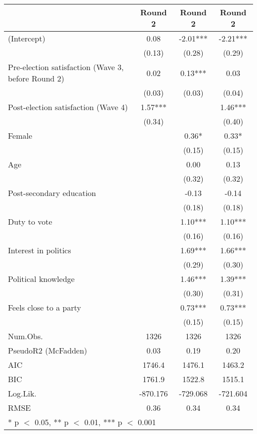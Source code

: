 \begin{table}
\centering
\begin{tabular}[t]{lccc}
\toprule
  & Round 2 & Round 2  & Round 2  \\
\midrule
(Intercept) & 0.08 & -2.01*** & -2.21***\\
 & (0.13) & (0.28) & (0.29)\\
Pre-election satisfaction (Wave 3, before Round 2) & 0.02 & 0.13*** & 0.03\\
 & (0.03) & (0.03) & (0.04)\\
Post-election satisfaction (Wave 4) & 1.57*** &  & 1.46***\\
 & (0.34) &  & (0.40)\\
Female &  & 0.36* & 0.33*\\
 &  & (0.15) & \vphantom{1} (0.15)\\
Age &  & 0.00 & 0.13\\
 &  & (0.32) & (0.32)\\
Post-secondary education &  & -0.13 & -0.14\\
 &  & (0.18) & (0.18)\\
Duty to vote &  & 1.10*** & 1.10***\\
 &  & (0.16) & (0.16)\\
Interest in politics &  & 1.69*** & 1.66***\\
 &  & (0.29) & (0.30)\\
Political knowledge &  & 1.46*** & 1.39***\\
 &  & (0.30) & (0.31)\\
Feels close to a party &  & 0.73*** & 0.73***\\
 &  & (0.15) & (0.15)\\
\midrule
Num.Obs. & 1326 & 1326 & 1326\\
PseudoR2 (McFadden) & 0.03 & 0.19 & 0.20\\
AIC & 1746.4 & 1476.1 & 1463.2\\
BIC & 1761.9 & 1522.8 & 1515.1\\
Log.Lik. & -870.176 & -729.068 & -721.604\\
RMSE & 0.36 & 0.34 & 0.34\\
\bottomrule
\multicolumn{4}{l}{\rule{0pt}{1em}* p $<$ 0.05, ** p $<$ 0.01, *** p $<$ 0.001}\\
\end{tabular}
\end{table}
